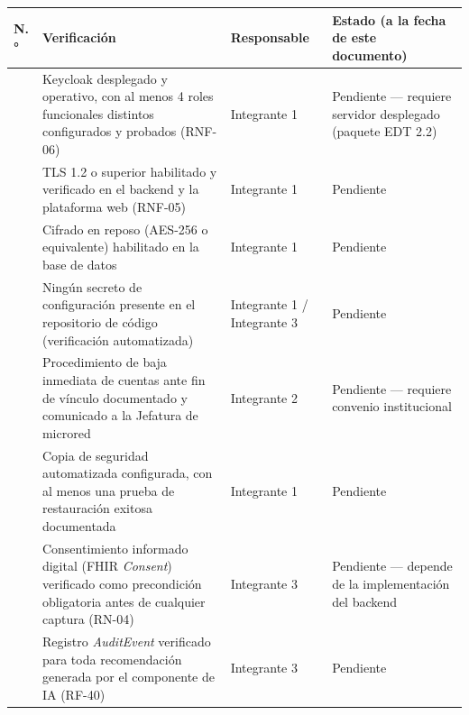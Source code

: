 \documentclass[11pt,a4paper]{article}
\begin{document}
{\small
\begin{longtable}[]{@{}
  >{\raggedright\arraybackslash}p{}
  >{\raggedright\arraybackslash}p{}
  >{\raggedright\arraybackslash}p{}
  >{\raggedright\arraybackslash}p{}@{}}
\toprule\noalign{}
\begin{minipage}[b]{\linewidth}\raggedright
N.°
\end{minipage} & \begin{minipage}[b]{\linewidth}\raggedright
Verificación
\end{minipage} & \begin{minipage}[b]{\linewidth}\raggedright
Responsable
\end{minipage} & \begin{minipage}[b]{\linewidth}\raggedright
Estado (a la fecha de este documento)
\end{minipage} \\
\midrule\noalign{}
\endhead
\bottomrule\noalign{}
\endlastfoot
1 & Keycloak desplegado y operativo, con al menos 4 roles funcionales distintos configurados y probados (RNF-06) & Integrante 1 & Pendiente --- requiere servidor desplegado (paquete EDT 2.2) \\
2 & TLS 1.2 o superior habilitado y verificado en el backend y la plataforma web (RNF-05) & Integrante 1 & Pendiente \\
3 & Cifrado en reposo (AES-256 o equivalente) habilitado en la base de datos & Integrante 1 & Pendiente \\
4 & Ningún secreto de configuración presente en el repositorio de código (verificación automatizada) & Integrante 1 / Integrante 3 & Pendiente \\
5 & Procedimiento de baja inmediata de cuentas ante fin de vínculo documentado y comunicado a la Jefatura de microred & Integrante 2 & Pendiente --- requiere convenio institucional \\
6 & Copia de seguridad automatizada configurada, con al menos una prueba de restauración exitosa documentada & Integrante 1 & Pendiente \\
7 & Consentimiento informado digital (FHIR \emph{Consent}) verificado como precondición obligatoria antes de cualquier captura (RN-04) & Integrante 3 & Pendiente --- depende de la implementación del backend \\
8 & Registro \emph{AuditEvent} verificado para toda recomendación generada por el componente de IA (RF-40) & Integrante 3 & Pendiente \\

\end{longtable}}
\end{document}
